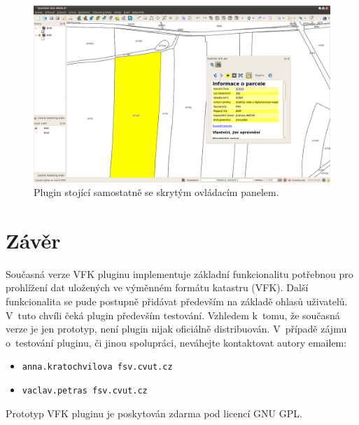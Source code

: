 \documentclass[a4paper,12pt]{article}
\begin{document}
\begin{figure}[h!]
\centering
\includegraphics[width=\textwidth]{./screenshoty/Quantum_GIS_08e6c37_039.png}
\caption{Plugin stojící samostatně se skrytým ovládacím panelem.}
\label{fig:screenshot3}
\end{figure}
\clearpage
\section{Závěr}
Současná verze VFK pluginu implementuje základní funkcionalitu potřebnou pro prohlížení dat uložených ve výměnném formátu katastru (VFK).
Další funkcionalita se pude postupně přidávat především na základě ohlasů uživatelů.
V~tuto chvíli čeká plugin především testování.
Vzhledem k~tomu, že současná verze je jen prototyp, není plugin nijak oficiálně distribuován.
V~případě zájmu o~testování pluginu, či jinou spolupráci, neváhejte kontaktovat autory emailem:
    \begin{itemize}
    \item \verb|anna.kratochvilova fsv.cvut.cz|
    \item \verb|vaclav.petras fsv.cvut.cz|
    \end{itemize}
    
Prototyp VFK pluginu je poskytován zdarma pod licencí GNU GPL.
\end{document}
